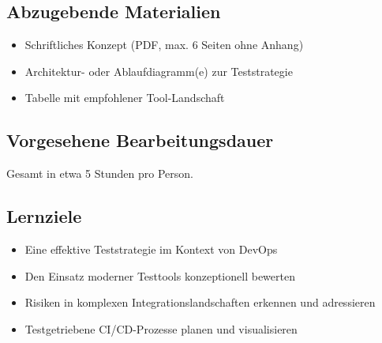 \subsection{Abzugebende Materialien}
\begin{itemize}
    \item Schriftliches Konzept (PDF, max. 6 Seiten ohne Anhang)
    \item Architektur- oder Ablaufdiagramm(e) zur Teststrategie
    \item Tabelle mit empfohlener Tool-Landschaft
\end{itemize}

\subsection{Vorgesehene Bearbeitungsdauer}
Gesamt in etwa 5 Stunden pro Person.

\subsection{Lernziele}
\begin{itemize}
    \item Eine effektive Teststrategie im Kontext von DevOps
    \item Den Einsatz moderner Testtools konzeptionell bewerten
    \item Risiken in komplexen Integrationslandschaften erkennen und adressieren
    \item Testgetriebene CI/CD-Prozesse planen und visualisieren
\end{itemize}

